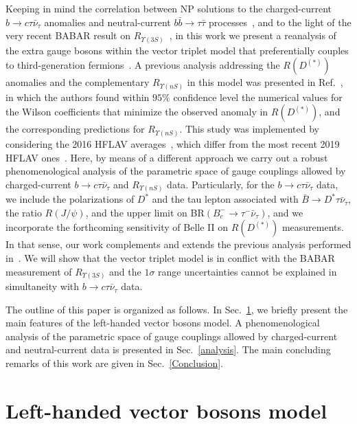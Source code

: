 \documentclass[reprint,showpacs,aps,prd,nofootinbib,superscriptaddress,longbibliography]{revtex4-1}
\begin{document}
Keeping in mind the correlation between NP solutions to the charged-current $b \to c \tau \bar{\nu}_{\tau}$ anomalies and neutral-current $b  \bar{b} \to \tau \bar{\tau}$ processes~\cite{Faroughy:2016osc,Aloni:2017eny}, and to the light of the very recent BABAR result on $R_{\Upsilon(3S)}$~\cite{Lees:2020kom}, in this work we present a reanalysis of the extra gauge bosons within the vector triplet model that preferentially couples to third-generation fermions~\cite{Greljo:2015mma,Faroughy:2016osc}. 
A previous analysis addressing the $R(D^{(\ast)})$ anomalies and the complementary $R_{\Upsilon(nS)}$ in this model was presented in Ref.~\cite{Aloni:2017eny}, in which the authors found within $95\%$ confidence level the numerical values for the Wilson coefficients that minimize the observed anomaly in $R(D^{(\ast)})$, and the corresponding predictions for $R_{\Upsilon(nS)}$. This study was implemented by considering the 2016 HFLAV averages~\cite{Amhis:2016xyh}, which differ from the most recent 2019 HFLAV ones~\cite{Amhis:2019ckw,HFLAVsummer}. Here, by means of a different approach we carry out a robust phenomenological analysis of the parametric space of gauge couplings allowed by charged-current $b \to c \tau \bar{\nu}_\tau$ and $R_{\Upsilon(nS)}$ data. Particularly, for the $b \to c \tau \bar{\nu}_\tau$ data, we include  the polarizations of $D^*$ and the tau lepton associated with $\bar{B} \to D^\ast \tau \bar{\nu}_\tau$, the ratio $R(J/\psi)$, and the upper limit on BR$(B_c^{-} \to \tau^{-} \bar{\nu}_\tau)$, and we incorporate the forthcoming sensitivity of Belle II on $R(D^{(\ast)})$ measurements. In that sense, our work complements and extends the previous analysis performed in~\cite{Aloni:2017eny}. We will show that the vector triplet model is in conflict with the BABAR measurement of $R_{\Upsilon(3S)}$ and the $1\sigma$ range uncertainties cannot be explained in simultaneity with $b \to c \tau \bar{\nu}_\tau$ data.


The outline of this paper is organized as follows. In Sec.~\ref{model}, we briefly present the main features of the left-handed vector bosons model. A phenomenological analysis of the parametric space of gauge couplings allowed by charged-current and neutral-current data is presented in Sec.~\ref{analysis}. The main concluding remarks of this work are given in Sec.~\ref{Conclusion}.


\section{Left-handed vector bosons model} \label{model}
 
\end{document}
